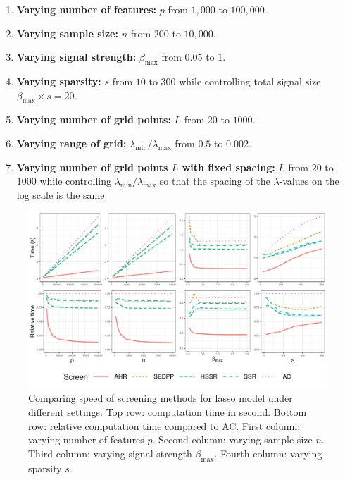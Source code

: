 \begin{enumerate}
    \item \textbf{Varying number of features:} $p$ from $1,000$ to $100,000$.
    \item \textbf{Varying sample size:} $n$ from $200$ to $10,000$.
    \item \textbf{Varying signal strength:} $\beta_{\max}$ from $0.05$ to $1$.
    \item \textbf{Varying sparsity:} $s$ from $10$ to $300$ while controlling total signal size $\beta_{\max}\times s=20$.
    \item \textbf{Varying number of grid points:}  $L$ from $20$ to $1000$.
    \item \textbf{Varying range of grid:}  $\lambda_{\min}/\lambda_{\max}$ from $0.5$ to $0.002$.
    \item \textbf{Varying number of grid points $L$ with fixed spacing:} $L$ from $20$ to $1000$ while controlling $\lambda_{\min}/\lambda_{\max}$ so that the spacing of the $\lambda$-values on the log scale is the same.
\end{enumerate}

\begin{figure}[h]
    \centering
    \includegraphics[scale = 0.59]{plots/511.pdf}    \caption{Comparing speed of screening methods for lasso model under different settings. Top row: computation time in second. Bottom row: relative computation time compared to AC. First column: varying number of features $p$. Second column: varying sample size $n$. Third column: varying signal strength $\beta_{\max}$. Fourth column: varying sparsity $s$.}
    \label{fig:5.1.1a}
\end{figure}

